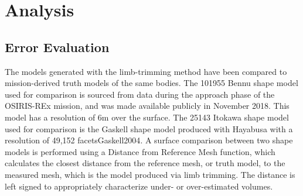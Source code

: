 \section{Analysis}
\subsection{Error Evaluation}
The models generated with the limb-trimming method have been compared to mission-derived truth models of the same bodies. The 101955 Bennu shape model used for comparison is sourced from data during the approach phase of the OSIRIS-REx mission, and was made available publicly in November 2018{}. This model has a resolution of 6m over the surface. The 25143 Itokawa shape model used for comparison is the Gaskell shape model produced with Hayabusa with a resolution of 49,152 facets{Gaskell2004}. A surface comparison between two shape models is performed using a Distance from Reference Mesh function, which calculates the closest distance from the reference mesh, or truth model, to the measured mesh, which is the model produced via limb trimming. The distance is left signed to appropriately characterize under- or over-estimated volumes. 


          
          
          

